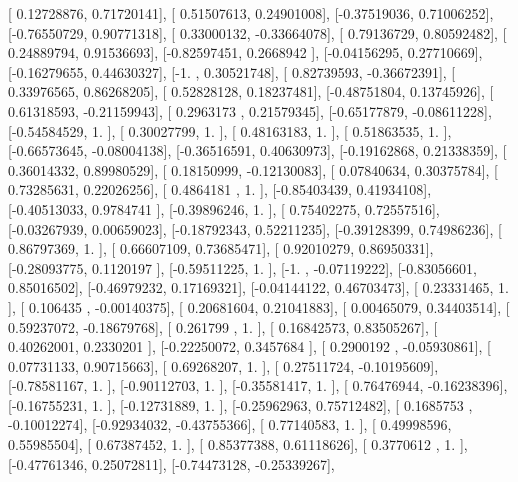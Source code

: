 \documentclass{article}
\begin{document}
       [ 0.12728876,  0.71720141],
       [ 0.51507613,  0.24901008],
       [-0.37519036,  0.71006252],
       [-0.76550729,  0.90771318],
       [ 0.33000132, -0.33664078],
       [ 0.79136729,  0.80592482],
       [ 0.24889794,  0.91536693],
       [-0.82597451,  0.2668942 ],
       [-0.04156295,  0.27710669],
       [-0.16279655,  0.44630327],
       [-1.        ,  0.30521748],
       [ 0.82739593, -0.36672391],
       [ 0.33976565,  0.86268205],
       [ 0.52828128,  0.18237481],
       [-0.48751804,  0.13745926],
       [ 0.61318593, -0.21159943],
       [ 0.2963173 ,  0.21579345],
       [-0.65177879, -0.08611228],
       [-0.54584529,  1.        ],
       [ 0.30027799,  1.        ],
       [ 0.48163183,  1.        ],
       [ 0.51863535,  1.        ],
       [-0.66573645, -0.08004138],
       [-0.36516591,  0.40630973],
       [-0.19162868,  0.21338359],
       [ 0.36014332,  0.89980529],
       [ 0.18150999, -0.12130083],
       [ 0.07840634,  0.30375784],
       [ 0.73285631,  0.22026256],
       [ 0.4864181 ,  1.        ],
       [-0.85403439,  0.41934108],
       [-0.40513033,  0.9784741 ],
       [-0.39896246,  1.        ],
       [ 0.75402275,  0.72557516],
       [-0.03267939,  0.00659023],
       [-0.18792343,  0.52211235],
       [-0.39128399,  0.74986236],
       [ 0.86797369,  1.        ],
       [ 0.66607109,  0.73685471],
       [ 0.92010279,  0.86950331],
       [-0.28093775,  0.1120197 ],
       [-0.59511225,  1.        ],
       [-1.        , -0.07119222],
       [-0.83056601,  0.85016502],
       [-0.46979232,  0.17169321],
       [-0.04144122,  0.46703473],
       [ 0.23331465,  1.        ],
       [ 0.106435  , -0.00140375],
       [ 0.20681604,  0.21041883],
       [ 0.00465079,  0.34403514],
       [ 0.59237072, -0.18679768],
       [ 0.261799  ,  1.        ],
       [ 0.16842573,  0.83505267],
       [ 0.40262001,  0.2330201 ],
       [-0.22250072,  0.3457684 ],
       [ 0.2900192 , -0.05930861],
       [ 0.07731133,  0.90715663],
       [ 0.69268207,  1.        ],
       [ 0.27511724, -0.10195609],
       [-0.78581167,  1.        ],
       [-0.90112703,  1.        ],
       [-0.35581417,  1.        ],
       [ 0.76476944, -0.16238396],
       [-0.16755231,  1.        ],
       [-0.12731889,  1.        ],
       [-0.25962963,  0.75712482],
       [ 0.1685753 , -0.10012274],
       [-0.92934032, -0.43755366],
       [ 0.77140583,  1.        ],
       [ 0.49998596,  0.55985504],
       [ 0.67387452,  1.        ],
       [ 0.85377388,  0.61118626],
       [ 0.3770612 ,  1.        ],
       [-0.47761346,  0.25072811],
       [-0.74473128, -0.25339267],
\end{document}
